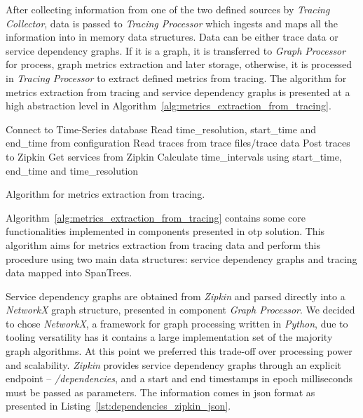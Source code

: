 After collecting information from one of the two defined sources by \emph{Tracing Collector}, data is passed to \emph{Tracing Processor} which ingests and maps all the information into in memory data structures. Data can be either trace data or service dependency graphs. If it is a graph, it is transferred to \emph{Graph Processor} for process, graph metrics extraction and later storage, otherwise, it is processed in \emph{Tracing Processor} to extract defined metrics from tracing. The algorithm for metrics extraction from tracing and service dependency graphs is presented at a high abstraction level in Algorithm~\ref{alg:metrics_extraction_from_tracing}.

\begin{algorithm}
    Connect to Time-Series database\;
    Read time\_resolution, start\_time and end\_time from configuration\;
    Read traces from trace files/trace data\;
    Post traces to Zipkin\;
    Get services from Zipkin\;
    Calculate time\_intervals using start\_time, end\_time and time\_resolution\;
    \caption{Algorithm for metrics extraction from tracing.}
    \label{alg:metrics_extraction_from_tracing}
\end{algorithm}

Algorithm~\ref{alg:metrics_extraction_from_tracing} contains some core functionalities implemented in components presented in \gls{otp} solution. This algorithm aims for metrics extraction from tracing data and perform this procedure using two main data structures: service dependency graphs and tracing data mapped into SpanTrees.

\newpage

Service dependency graphs are obtained from \emph{Zipkin} and parsed directly into a \emph{NetworkX} graph structure, presented in component \emph{Graph Processor}. We decided to chose \emph{NetworkX}, a framework for graph processing written in \emph{Python}, due to tooling versatility has it contains a large implementation set of the majority graph algorithms. At this point we preferred this trade-off over processing power and scalability. \emph{Zipkin} provides service dependency graphs through an explicit endpoint -- \emph{/dependencies}, and a start and end timestamps in epoch milliseconds must be passed as parameters. The information comes in \gls{json} format as presented in Listing~\ref{lst:dependencies_zipkin_json}.

